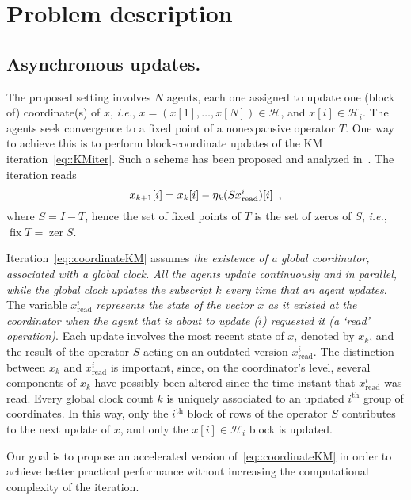 \documentclass[envcountsect]{svjour3}
\newcommand{\ie}{{\it i.e.}}
\newcommand{\Hil}{{\mathcal{H} }}
\begin{document}
\section{Problem description}\label{sec::problem} %

\subsection{Asynchronous updates. }\label{sec::async} %
The proposed setting involves $N$ agents, each one assigned to update one (block of) coordinate(s) of $x$, \ie, $x=(x[1], \ldots, x[N])\in\Hil$, and $x[i]\in\Hil_i$. The agents seek convergence to a fixed point of a nonexpansive operator $T$. One way to achieve this is to perform block-coordinate updates of the KM iteration~\eqref{eq::KMiter}. Such a scheme has been proposed and analyzed in~\cite{peng2015arock}. The iteration reads
\begin{equation}{\label{eq::coordinateKM}}
 x_{k+1}[i] = x_{k}[i] - \eta_k(Sx_\mathrm{read}^i)[i]\enspace,
\end{equation}
where $S=I-T$, hence the set of fixed points of $T$ is the set of zeros of $S$, \ie, $\operatorname{fix} T = \operatorname{zer} S$.

Iteration~\eqref{eq::coordinateKM} assumes \emph{the existence of a global coordinator, associated with a global clock. All the agents update continuously and in parallel, while the global clock updates the subscript $k$ every time that an agent updates}. The variable $x_\mathrm{read}^i$ \emph{represents the state of the vector $x$ as it existed at the coordinator when the agent that is about to update ($i$) requested it (a `read' operation)}. Each update involves the most recent state of $x$, denoted by $x_k$, and the result of the operator $S$ acting on an outdated version $x_\mathrm{read}^i$. The distinction between $x_k$ and $x_\mathrm{read}^i$ is important, since, on the coordinator's level, several components of $x_k$ have possibly been altered since the time instant that $x_\mathrm{read}^i$ was read. Every global clock count $k$ is uniquely associated to an updated $i^\mathrm{th}$ group of coordinates. In this way, only the $i^\mathrm{th}$ block of rows of the operator $S$ contributes to the next update of $x$, and only the $x[i]\in\Hil_{i}$ block is updated.


Our goal is to propose an accelerated version of~\eqref{eq::coordinateKM} in order to achieve better practical performance without increasing the computational complexity of the iteration.
\end{document}

